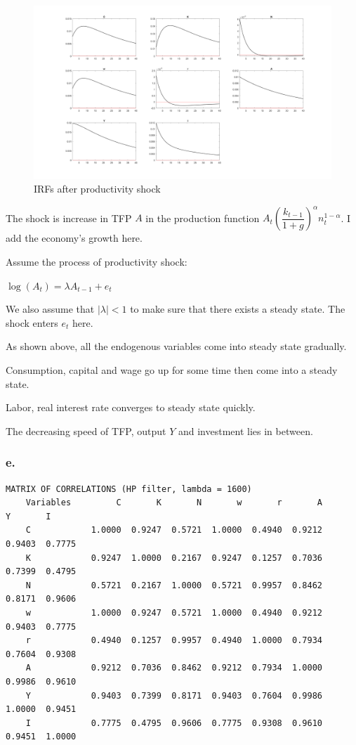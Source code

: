 \documentclass{article}
\begin{document}
\begin{figure}[H]
    \begin{center}
        \includegraphics[width=1\textwidth]{figures/IRFs.png}
    \end{center}
    \caption{IRFs after productivity shock}
    \label{fig:graph}
\end{figure}

The shock is increase in TFP $A$ in the production function $A_{t}\left(\dfrac{k_{t-1}}{1+g}\right)^{\alpha}n^{1-\alpha}_{t}$. I add the economy's growth here.

Assume the process of productivity shock:

$\log\left(A_{t}\right)=\lambda A_{t-1}+e_{t}$

We also assume that $|\lambda|<1$ to make sure that there exists a steady state. The shock enters $e_{t}$ here.

As shown above, all the endogenous variables come into steady state gradually. 

Consumption, capital and wage go up for some time then come into a steady state. 

Labor, real interest rate converges to steady state quickly. 

The decreasing speed of TFP, output $Y$ and investment lies in between.

\subsubsection*{\textrm{e.}}

\begin{lstlisting}[basicstyle=\footnotesize\ttfamily]
    MATRIX OF CORRELATIONS (HP filter, lambda = 1600)
    Variables         C       K       N       w       r       A       Y       I
    C            1.0000  0.9247  0.5721  1.0000  0.4940  0.9212  0.9403  0.7775
    K            0.9247  1.0000  0.2167  0.9247  0.1257  0.7036  0.7399  0.4795
    N            0.5721  0.2167  1.0000  0.5721  0.9957  0.8462  0.8171  0.9606
    w            1.0000  0.9247  0.5721  1.0000  0.4940  0.9212  0.9403  0.7775
    r            0.4940  0.1257  0.9957  0.4940  1.0000  0.7934  0.7604  0.9308
    A            0.9212  0.7036  0.8462  0.9212  0.7934  1.0000  0.9986  0.9610
    Y            0.9403  0.7399  0.8171  0.9403  0.7604  0.9986  1.0000  0.9451
    I            0.7775  0.4795  0.9606  0.7775  0.9308  0.9610  0.9451  1.0000
\end{lstlisting}
\end{document}
